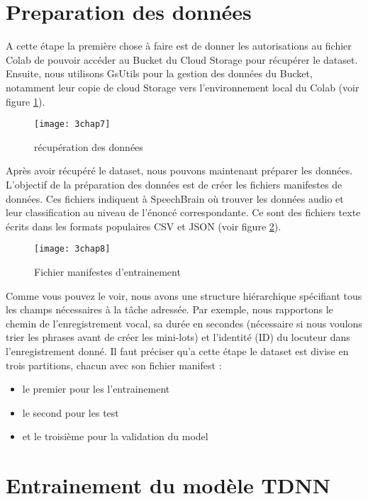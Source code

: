 \section{Preparation des données}
A cette étape la première chose à faire est de donner les autorisations au fichier Colab de pouvoir accéder au Bucket du Cloud Storage pour récupérer le dataset. Ensuite, nous utilisons GsUtils pour la gestion des données du Bucket, notamment leur copie de cloud Storage vers l’environnement local du Colab (voir figure \ref{fig:3chap7}).

\begin{figure}[h]
    \centering
    \texttt{[image: 3chap7]}
    \caption{récupération des données}
    \label{fig:3chap7}
\end{figure}
Après avoir récupéré le dataset, nous pouvons maintenant préparer les données.  L'objectif de la préparation des données est de créer les fichiers manifestes de données. Ces fichiers indiquent à SpeechBrain où trouver les données audio et leur classification au niveau de l'énoncé correspondante. Ce sont des fichiers texte écrits dans les formats populaires CSV et JSON  (voir figure \ref{fig:3chap8}).
\begin{figure}[h]
    \centering
    \texttt{[image: 3chap8]}
    \caption{Fichier manifestes d'entrainement}
    \label{fig:3chap8}
\end{figure}

Comme vous pouvez le voir, nous avons une structure hiérarchique spécifiant tous les champs nécessaires à la tâche adressée. Par exemple, nous rapportons le chemin de l'enregistrement vocal, sa durée en secondes (nécessaire si nous voulons trier les phrases avant de créer les mini-lots) et l'identité (ID) du locuteur dans l'enregistrement donné.
Il faut préciser qu’a cette étape le dataset est divise en trois partitions, chacun avec son fichier manifest :
\begin{itemize}
    \item le premier pour les l’entrainement
    \item le second pour les test
    \item et le troisième pour la validation du model
\end{itemize}

\section{Entrainement du modèle TDNN}

